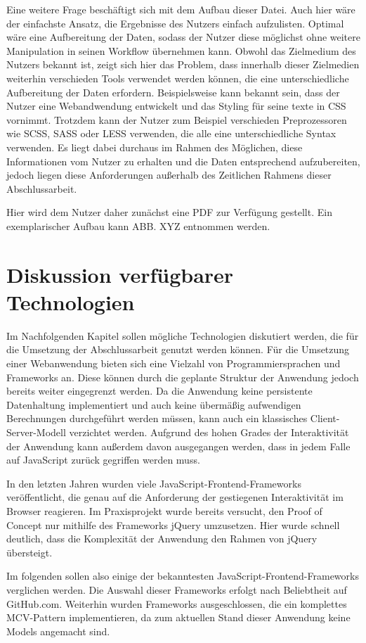 Eine weitere Frage beschäftigt sich mit dem Aufbau dieser Datei. Auch hier wäre der einfachste Ansatz, die Ergebnisse des Nutzers einfach aufzulisten. Optimal wäre eine Aufbereitung der Daten, sodass der Nutzer diese möglichst ohne weitere Manipulation in seinen Workflow übernehmen kann. Obwohl das Zielmedium des Nutzers bekannt ist, zeigt sich hier das Problem, dass innerhalb dieser Zielmedien weiterhin verschieden Tools verwendet werden können, die eine unterschiedliche Aufbereitung der Daten erfordern.
Beispielsweise kann bekannt sein, dass der Nutzer eine Webandwendung entwickelt und das Styling für seine texte in CSS vornimmt. Trotzdem kann der Nutzer zum Beispiel verschieden Preprozessoren wie SCSS, SASS oder LESS verwenden, die alle eine unterschiedliche Syntax verwenden.
Es liegt dabei durchaus im Rahmen des Möglichen, diese Informationen vom Nutzer zu erhalten und die Daten entsprechend aufzubereiten, jedoch liegen diese Anforderungen außerhalb des Zeitlichen Rahmens dieser Abschlussarbeit.

Hier wird dem Nutzer daher zunächst eine PDF zur Verfügung gestellt. Ein exemplarischer Aufbau kann ABB. XYZ entnommen werden.

\section{Diskussion verfügbarer Technologien}
Im Nachfolgenden Kapitel sollen mögliche Technologien diskutiert werden, die für die Umsetzung der Abschlussarbeit genutzt werden können. Für die Umsetzung einer Webanwendung bieten sich eine Vielzahl von Programmiersprachen und Frameworks an. Diese können durch die geplante Struktur der Anwendung jedoch bereits weiter eingegrenzt werden. Da die Anwendung keine persistente Datenhaltung implementiert und auch keine übermäßig aufwendigen Berechnungen durchgeführt werden müssen, kann auch ein klassisches Client-Server-Modell verzichtet werden.
Aufgrund des hohen Grades der Interaktivität der Anwendung kann außerdem davon ausgegangen werden, dass in jedem Falle auf JavaScript zurück gegriffen werden muss.

In den letzten Jahren wurden viele JavaScript-Frontend-Frameworks veröffentlicht, die genau auf die Anforderung der gestiegenen Interaktivität im Browser reagieren.
Im Praxisprojekt wurde bereits versucht, den Proof of Concept nur mithilfe des Frameworks jQuery umzusetzen. Hier wurde schnell deutlich, dass die Komplexität der Anwendung den Rahmen von jQuery übersteigt.

Im folgenden sollen also einige der bekanntesten JavaScript-Frontend-Frameworks verglichen werden. Die Auswahl dieser Frameworks erfolgt nach Beliebtheit auf GitHub.com. Weiterhin wurden Frameworks ausgeschlossen, die ein komplettes MCV-Pattern implementieren, da zum aktuellen Stand dieser Anwendung keine Models angemacht sind.

